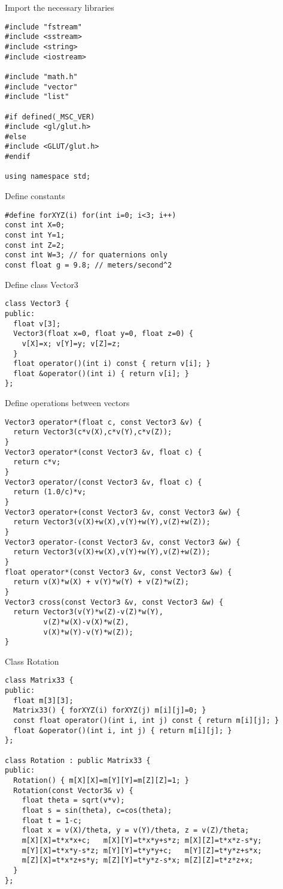 
Import the necessary libraries
\begin{lstlisting}
#include "fstream"
#include <sstream>
#include <string>
#include <iostream>

#include "math.h"
#include "vector"
#include "list"

#if defined(_MSC_VER)
#include <gl/glut.h>
#else
#include <GLUT/glut.h>
#endif

using namespace std;
\end{lstlisting}

Define constants
\begin{lstlisting}
#define forXYZ(i) for(int i=0; i<3; i++)
const int X=0;
const int Y=1;
const int Z=2;
const int W=3; // for quaternions only
const float g = 9.8; // meters/second^2
\end{lstlisting}

Define class Vector3
\begin{lstlisting}
class Vector3 {
public:
  float v[3];
  Vector3(float x=0, float y=0, float z=0) {
    v[X]=x; v[Y]=y; v[Z]=z;
  }
  float operator()(int i) const { return v[i]; }
  float &operator()(int i) { return v[i]; }
};
\end{lstlisting}

Define operations between vectors
\begin{lstlisting}
Vector3 operator*(float c, const Vector3 &v) {
  return Vector3(c*v(X),c*v(Y),c*v(Z));
}
Vector3 operator*(const Vector3 &v, float c) {
  return c*v;
}
Vector3 operator/(const Vector3 &v, float c) {
  return (1.0/c)*v;
}
Vector3 operator+(const Vector3 &v, const Vector3 &w) {
  return Vector3(v(X)+w(X),v(Y)+w(Y),v(Z)+w(Z));
}
Vector3 operator-(const Vector3 &v, const Vector3 &w) {
  return Vector3(v(X)+w(X),v(Y)+w(Y),v(Z)+w(Z));
}
float operator*(const Vector3 &v, const Vector3 &w) {
  return v(X)*w(X) + v(Y)*w(Y) + v(Z)*w(Z);
}
Vector3 cross(const Vector3 &v, const Vector3 &w) {
  return Vector3(v(Y)*w(Z)-v(Z)*w(Y),
		 v(Z)*w(X)-v(X)*w(Z),
		 v(X)*w(Y)-v(Y)*w(Z));
}
\end{lstlisting}

Class Rotation
\begin{lstlisting}
class Matrix33 {
public:
  float m[3][3];
  Matrix33() { forXYZ(i) forXYZ(j) m[i][j]=0; }
  const float operator()(int i, int j) const { return m[i][j]; }
  float &operator()(int i, int j) { return m[i][j]; }
};

class Rotation : public Matrix33 {
public:
  Rotation() { m[X][X]=m[Y][Y]=m[Z][Z]=1; }
  Rotation(const Vector3& v) {
    float theta = sqrt(v*v);
    float s = sin(theta), c=cos(theta);
    float t = 1-c;
    float x = v(X)/theta, y = v(Y)/theta, z = v(Z)/theta;
    m[X][X]=t*x*x+c;   m[X][Y]=t*x*y+s*z; m[X][Z]=t*x*z-s*y;
    m[Y][X]=t*x*y-s*z; m[Y][Y]=t*y*y+c;   m[Y][Z]=t*y*z+s*x;
    m[Z][X]=t*x*z+s*y; m[Z][Y]=t*y*z-s*x; m[Z][Z]=t*z*z+x;
  }
};
\end{lstlisting}

